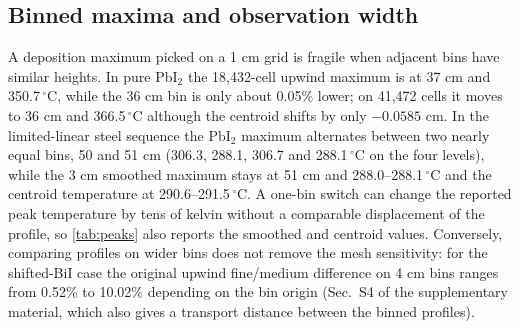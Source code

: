 \subsection{Binned maxima and observation width}
A deposition maximum picked on a 1 cm grid is fragile when adjacent
bins have similar heights. In pure PbI$_2$ the 18,432-cell upwind
maximum is at 37 cm and 350.7\,$^\circ$C, while the 36 cm bin is only
about 0.05\% lower; on 41,472 cells it moves to 36 cm and
366.5\,$^\circ$C although the centroid shifts by only $-0.0585$ cm. In
the limited-linear steel sequence the PbI$_2$ maximum alternates between
two nearly equal bins, 50 and 51 cm (306.3, 288.1, 306.7 and
288.1\,$^\circ$C on the four levels), while the 3 cm smoothed maximum
stays at 51 cm and 288.0--288.1\,$^\circ$C and the centroid temperature
at 290.6--291.5\,$^\circ$C. A one-bin switch can change the reported
peak temperature by tens of kelvin without a comparable displacement of
the profile, so \cref{tab:peaks} also reports the smoothed and centroid
values. Conversely, comparing profiles on wider bins does not remove the
mesh sensitivity: for the shifted-BiI case the original upwind
fine/medium difference on 4 cm bins ranges from 0.52\% to 10.02\%
depending on the bin origin (Sec.~S4 of the supplementary material,
which also gives a transport distance between the binned profiles).
